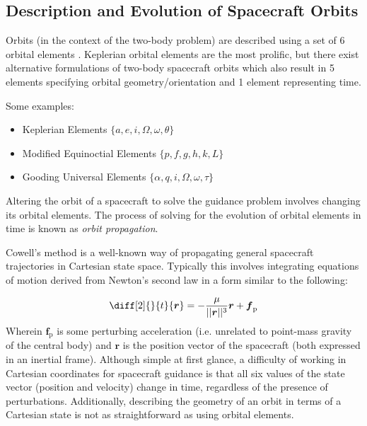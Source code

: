 \subsection{Description and Evolution of Spacecraft Orbits}

Orbits (in the context of the two-body problem) are described using a set of 6 orbital elements \cite{book:1487513}. Keplerian orbital elements are the most prolific, but there exist alternative formulations of two-body spacecraft orbits which also result in 5 elements specifying orbital geometry/orientation and 1 element representing time.

Some examples:
\begin{itemize}
  \item Keplerian Elements \(\{a, e, i, \Omega, \omega, \theta\}\)
  \item Modified Equinoctial Elements \(\{p, f, g, h, k, L\}\) \cite{walker1985set}
  \item Gooding Universal Elements  \(\{\alpha, q, i, \Omega, \omega, \tau\}\) \cite{gooding_universal_elements}
\end{itemize}

Altering the orbit of a spacecraft to solve the guidance problem involves changing its orbital elements. The process of solving for the evolution of orbital elements in time is known as \textit{orbit propagation}.

Cowell's method \cite{book:1487513} is a well-known way of propagating general spacecraft trajectories in Cartesian state space. Typically this involves integrating equations of motion derived from Newton's second law in a form similar to the following:

\begin{equation}
  \diff[2]{}{t}{\boldsymbol{r}} = -\frac{\mu}{||\boldsymbol{r}||^3} \boldsymbol{r} + \boldsymbol{f}_\mathrm{p} \label{eq:cowells_method}
\end{equation}
Wherein \(\boldsymbol{f}_\mathrm{p}\) is some perturbing acceleration (i.e. unrelated to point-mass gravity of the central body) and \(\boldsymbol{r}\) is the position vector of the spacecraft (both expressed in an inertial frame). Although simple at first glance, a difficulty of working in Cartesian coordinates for spacecraft guidance is that all six values of the state vector (position and velocity) change in time, regardless of the presence of perturbations. Additionally, describing the geometry of an orbit in terms of a Cartesian state is not as straightforward as using orbital elements.

